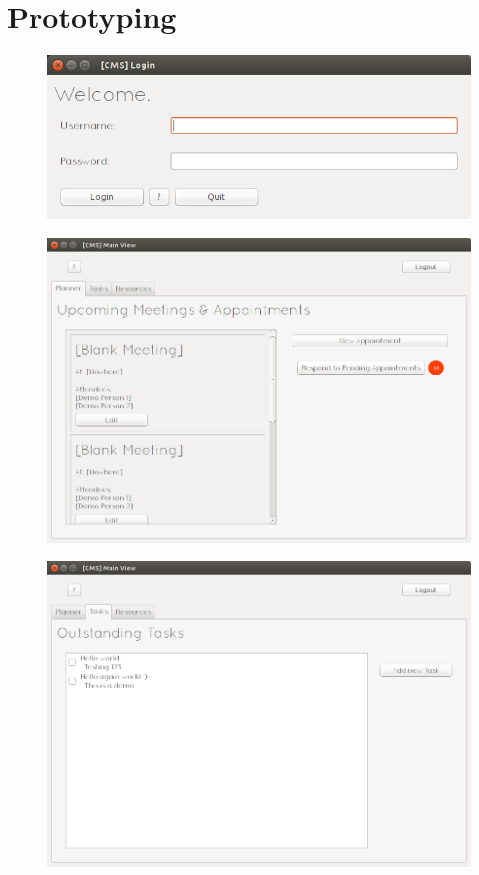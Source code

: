 
	\begin{figure}[H]
	\end{figure}

\section{Prototyping}
	\begin{figure}[H]
		\includegraphics[width=\textwidth]{./Design/proto/1.png}
	\end{figure}
	\begin{figure}[H]
		\includegraphics[width=\textwidth]{./Design/proto/2.png}
	\end{figure}
	\begin{figure}[H]
		\includegraphics[width=\textwidth]{./Design/proto/3.png}
	\end{figure}
